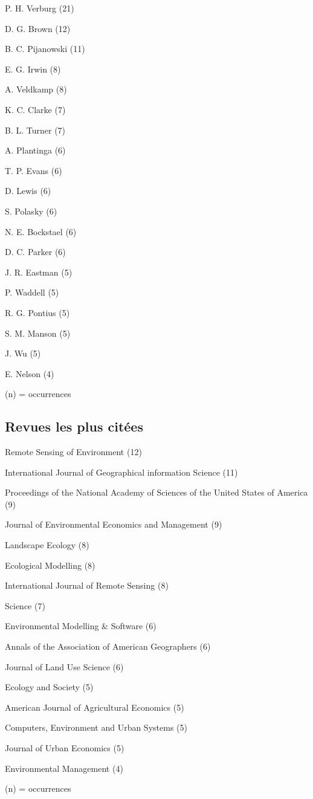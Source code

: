 \item P. H. Verburg (21)
\item D. G. Brown (12)
\item B. C. Pijanowski (11)
\item E. G. Irwin (8)
\item A. Veldkamp (8)
\item K. C. Clarke (7)
\item B. L. Turner (7)
\item A. Plantinga (6)
\item T. P. Evans (6)
\item D. Lewis (6)
\item S. Polasky (6)
\item N. E. Bockstael (6)
\item D. C. Parker (6)
\item J. R. Eastman (5)
\item P. Waddell (5)
\item R. G. Pontius (5)
\item S. M. Manson (5)
\item J. Wu (5)
\item E. Nelson (4)

\stopitemize

(n) = occurrences
\stopcolumns

\subsection
{Revues les plus citées}

\startitemize[n,packed]

\item Remote Sensing of Environment (12)
\item International Journal of Geographical information Science (11)
\item Proceedings of the National Academy of Sciences of the United States of America (9)
\item Journal of Environmental Economics and Management (9)
\item Landscape Ecology (8)
\item Ecological Modelling (8)
\item International Journal of Remote Sensing (8)
\item Science (7)
\item Environmental Modelling \& Software (6)
\item Annals of the Association of American Geographers (6)
\item Journal of Land Use Science (6)
\item Ecology and Society (5)
\item American Journal of Agricultural Economics (5)
\item Computers, Environment and Urban Systems (5)
\item Journal of Urban Economics (5)
\item Environmental Management (4)

\stopitemize

(n) = occurrences
